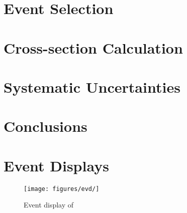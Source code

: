 \documentclass[letterpaper,12pt]{article}
\begin{document}
\section{Event Selection}

\section{Cross-section Calculation}

\section{Systematic Uncertainties}

\section{Conclusions}

\appendix
\section{Event Displays}

\begin{figure}[!hbtp]
  \begin{center}
    \texttt{[image: figures/evd/]}
    \caption{%
                Event display of 
            }
    \label{fig:evd_alkdsg}
  \end{center}
\end{figure}



\end{document}
